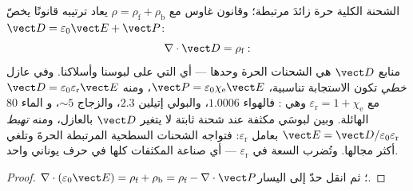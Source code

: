 \begin{proposition}\label{prop:b3:electromagnetism-in-matter:displacement}
الشحنة الكلية حرة زائدَ مرتبطة؛ وقانون غاوس مع $\rho =
\rho_{\text{f}} + \rho_{\text{b}}$ يعاد ترتيبه قانونًا يخصّ
\emph{} $\vect D = \varepsilon_0\vect E +
\vect P$:
\[
\nabla\cdot\vect D = \rho_{\text{f}} :
\]
منابع $\vect D$ هي الشحنات الحرة وحدها --- أي التي على
لبوسنا وأسلاكنا. وفي عازل \emph{خطي} تكون الاستجابة
تناسبية، $\vect P = \varepsilon_0\chi_{\text{e}}\vect E$، ومنه
$\vect D = \varepsilon_0\varepsilon_{\text{r}}\vect E$ مع
$\varepsilon_{\text{r}} = 1 + \chi_{\text{e}}$ وهي \emph{}: فالهواء $1.0006$، والبولي إتيلين $2.3$، والزجاج $\sim 5$، و
الماء $80$ الهائلة. وبين لبوسَي مكثفة عند شحنة
ثابتة لا يتغير $\vect D$ بالعازل، ومنه \emph{تهبط} $\vect E =
\vect D/\varepsilon_0\varepsilon_{\text{r}}$ بعامل
$\varepsilon_{\text{r}}$: فتواجه الشحنات السطحية المرتبطة الحرةَ
وتلغي أكثر مجالها. وتُضرب السعة في
$\varepsilon_{\text{r}}$ --- أي صناعة المكثفات كلها في حرف
يوناني واحد.
\end{proposition}

\begin{proof}
$\nabla\cdot(\varepsilon_0\vect E) = \rho_{\text{f}} +
\rho_{\text{b}} = \rho_{\text{f}} - \nabla\cdot\vect P$؛ ثم انقل حدّ
 إلى اليسار.
\end{proof}

